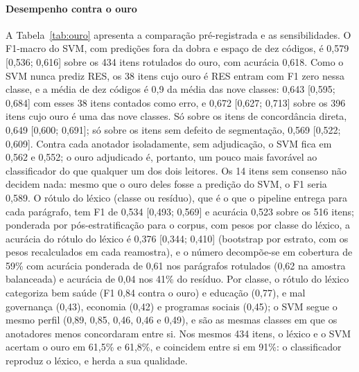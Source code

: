 \documentclass[fleqn,10pt]{SelfArx}
\begin{document}
\paragraph{Desempenho contra o ouro} A Tabela~\ref{tab:ouro} apresenta a comparação pré-registrada e as sensibilidades. O F1-macro do SVM, com predições fora da dobra e espaço de dez códigos, é 0,579 [0,536; 0,616] sobre os 434 itens rotulados do ouro, com acurácia 0,618. Como o SVM nunca prediz RES, os 38 itens cujo ouro é RES entram com F1 zero nessa classe, e a média de dez códigos é 0,9 da média das nove classes: 0,643 [0,595; 0,684] com esses 38 itens contados como erro, e 0,672 [0,627; 0,713] sobre os 396 itens cujo ouro é uma das nove classes. Só sobre os itens de concordância direta, 0,649 [0,600; 0,691]; só sobre os itens sem defeito de segmentação, 0,569 [0,522; 0,609]. Contra cada anotador isoladamente, sem adjudicação, o SVM fica em 0,562 e 0,552; o ouro adjudicado é, portanto, um pouco mais favorável ao classificador do que qualquer um dos dois leitores. Os 14 itens sem consenso não decidem nada: mesmo que o ouro deles fosse a predição do SVM, o F1 seria 0,589. O rótulo do léxico (classe ou resíduo), que é o que o pipeline entrega para cada parágrafo, tem F1 de 0,534 [0,493; 0,569] e acurácia 0,523 sobre os 516 itens; ponderada por pós-estratificação para o corpus, com pesos por classe do léxico, a acurácia do rótulo do léxico é 0,376 [0,344; 0,410] (bootstrap por estrato, com os pesos recalculados em cada reamostra), e o número decompõe-se em cobertura de 59\% com acurácia ponderada de 0,61 nos parágrafos rotulados (0,62 na amostra balanceada) e acurácia de 0,04 nos 41\% do resíduo. Por classe, o rótulo do léxico categoriza bem saúde (F1 0,84 contra o ouro) e educação (0,77), e mal governança (0,43), economia (0,42) e programas sociais (0,45); o SVM segue o mesmo perfil (0,89, 0,85, 0,46, 0,46 e 0,49), e são as mesmas classes em que os anotadores menos concordaram entre si. Nos mesmos 434 itens, o léxico e o SVM acertam o ouro em 61,5\% e 61,8\%, e coincidem entre si em 91\%: o classificador reproduz o léxico, e herda a sua qualidade.
\end{document}
